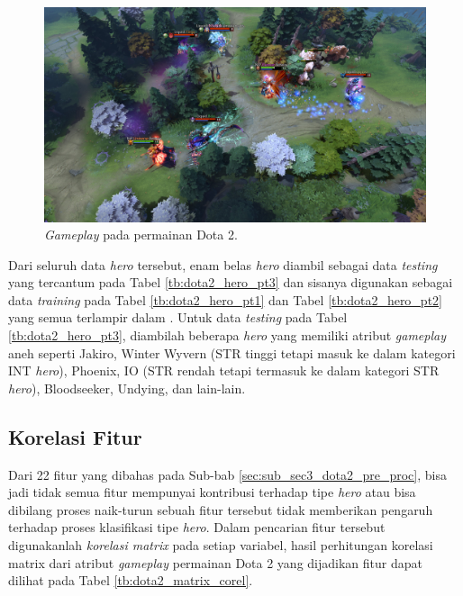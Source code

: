 \begin{figure} [!h] \centering
	\includegraphics[scale=0.12]{img/dota2_gameplay.jpg}
	\caption{\textit{Gameplay} pada permainan Dota 2.}
	\label{fig:dota2_gameplay}
\end{figure}

Dari seluruh data \textit{hero} tersebut, enam belas \textit{hero} diambil sebagai data \textit{testing} yang tercantum pada Tabel \ref{tb:dota2_hero_pt3} dan sisanya digunakan sebagai data \textit{training} pada Tabel \ref{tb:dota2_hero_pt1} dan Tabel \ref{tb:dota2_hero_pt2} yang semua terlampir dalam . Untuk data \textit{testing} pada Tabel \ref{tb:dota2_hero_pt3}, diambilah beberapa \textit{hero} yang memiliki atribut \textit{gameplay} aneh seperti Jakiro, Winter Wyvern (STR tinggi tetapi masuk ke dalam kategori INT \textit{hero}), Phoenix, IO (STR rendah tetapi termasuk ke dalam kategori STR \textit{hero}), Bloodseeker, Undying, dan lain-lain.
\vspace{1ex}

\subsection{Korelasi Fitur}
\label{sec:sub_sec3_dota2_feature_corel}
\vspace{1ex}

Dari 22 fitur yang dibahas pada Sub-bab \ref{sec:sub_sec3_dota2_pre_proc}, bisa jadi tidak semua fitur mempunyai kontribusi terhadap tipe \textit{hero} atau bisa dibilang proses naik-turun sebuah fitur tersebut tidak memberikan pengaruh terhadap proses klasifikasi tipe \textit{hero}. Dalam pencarian fitur tersebut digunakanlah \textit{korelasi matrix} pada setiap variabel, hasil perhitungan korelasi matrix dari atribut \textit{gameplay} permainan Dota 2 yang dijadikan fitur dapat dilihat pada Tabel \ref{tb:dota2_matrix_corel}.
\vspace{-1ex}

